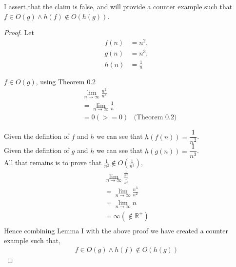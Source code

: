 \documentclass[12pt]{article}
\newcommand{\R}{\mathbb{R}}
\newenvironment{lemma}[2][Lemma]{\begin{trivlist}
\item[\hskip \labelsep {\bfseries #1}\hskip \labelsep {\bfseries #2.}]}{\end{trivlist}}
\newenvironment{question}[2][Question]{\begin{trivlist}
\item[\hskip \labelsep {\bfseries #1}\hskip \labelsep {\bfseries #2.}]}{\end{trivlist}}
\begin{document}
\begin{question}{3}
  I assert that the claim is false, and will provide a counter example such
  that $f \in O(g) \land h(f) \notin O(h(g))$.
  \begin{proof}
    Let
    \begin{align*}
      f(n) &= n^{2},\\
      g(n) &= n^{3},\\
      h(n) &= \frac{1}{n}
    \end{align*}

    \begin{lemma}{I} $f \in O(g)$, using Theorem 0.2
      \begin{align*}
        & \lim_{n\to\infty} \frac{n^{2}}{n^{3}} &  \\
        & = \lim_{n\to\infty} \frac{1}{n}       & \\
        & = 0 (>= 0)                            & \text{(Theorem 0.2)}
      \end{align*}
    \end{lemma}

    Given the defintion of $f$ and $h$ we can see that $h(f(n)) = \dfrac{1}{n^{2}}$.\\
    Given the defintion of $g$ and $h$ we can see that $h(g(n)) = \dfrac{1}{n^{3}}$.\\
    All that remains is to prove that $\frac{1}{n^{2}}\notin O(\frac{1}{n^{3}})$,
    \begin{align*}
    & \lim_{n\to\infty} \frac{\frac{1}{n^{2}}}{\frac{1}{n^{3}}} &\\
        & = \lim_{n\to\infty} \frac{n^3}{n^2} &\\
        & = \lim_{n\to\infty} n &\\
        & = \infty (\notin \R^{+}) &\\
    \end{align*}
    Hence combining Lemma I with the above proof we have created a counter example
    such that,
    \begin{align*}
      f \in O(g) \land h(f) \notin O(h(g))
    \end{align*}
  \end{proof}
\end{question}
\end{document}
